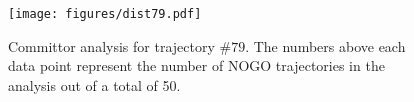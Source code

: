 \documentclass[%
preprint,
 amsmath,amssymb,
 aps,
prb,
]{revtex4-2}
\begin{document}
%
\begin{figure}[ht!]
\centering
\texttt{[image: figures/dist79.pdf]}
\label{fig:comm61}
\caption{Committor analysis for trajectory $\#79$. The numbers above each data point represent the 
number of NOGO trajectories in the analysis out of a total of 50.}
\end{figure}
%
%
\end{document}
